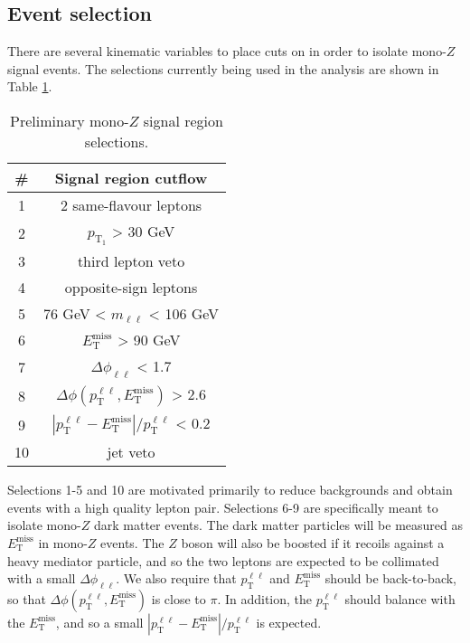 \subsection{Event selection}
\label{sec:opt}

There are several kinematic variables to place cuts on in order to isolate mono-$Z$ signal events. The selections currently being used in the analysis are shown in Table \ref{tbl:cutflow}.

\begin{table}[ht]
\centering
\begin{tabular}{|c||c|}
\hline
\# & Signal region cutflow											\\ \hline \hline
1 & 2 same-flavour leptons										\\ \hline 
2 & $p_{\text{T}_1}$ > 30 GeV										\\  \hline
3 & third lepton veto												\\  \hline
4 & opposite-sign leptons											\\  \hline
5 & 76 GeV < $m_{\ell\ell}$ < 106 GeV								\\  \hline
6 & $E_\text{T}^{\text{miss}}$ > 90 GeV								\\ \hline
7 & $\Delta \phi_{\ell\ell}$ < 1.7										\\  \hline
8 & $\Delta \phi (p_\text{T}^{\ell\ell}, E_\text{T}^{\text{miss}})$ > 2.6			\\  \hline
9 & $|p_\text{T}^{\ell\ell} - E_\text{T}^{\text{miss}}|/p_\text{T}^{\ell\ell}$ < 0.2	\\  \hline
10 & jet veto 													\\ \hline
\end{tabular}
\caption[Preliminary mono-$Z$ signal region selections]{Preliminary mono-$Z$ signal region selections.}
\label{tbl:cutflow}
\end{table}

\noindent Selections 1-5 and 10 are motivated primarily to reduce backgrounds and obtain events with a high quality lepton pair. Selections 6-9 are specifically meant to isolate mono-$Z$ dark matter events. The dark matter particles will be measured as $E_\text{T}^{\text{miss}}$ in mono-$Z$ events. The $Z$ boson will also be boosted if it recoils against a heavy mediator particle, and so the two leptons are expected to be collimated with a small $\Delta \phi_{\ell\ell}$. We also require that $p_\text{T}^{\ell\ell}$ and $E_\text{T}^{\text{miss}}$ should be back-to-back, so that $\Delta \phi (p_\text{T}^{\ell\ell}, E_\text{T}^{\text{miss}})$ is close to $\pi$. In addition, the $p_\text{T}^{\ell\ell}$ should balance with the $E_\text{T}^{\text{miss}}$, and so a small $|p_\text{T}^{\ell\ell} - E_\text{T}^{\text{miss}}|/p_\text{T}^{\ell\ell}$ is expected. 

